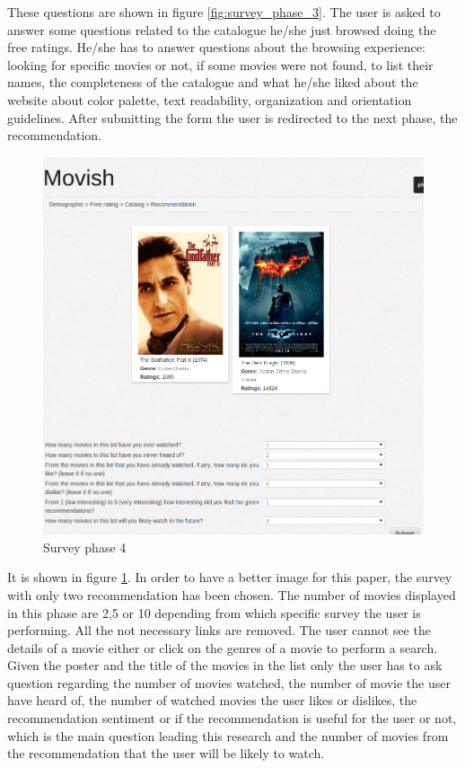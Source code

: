 These questions are shown in figure \ref{fig:survey_phase_3}. The user is asked to answer some questions related to the catalogue he/she just browsed doing the free ratings. He/she has to answer questions about the browsing experience: looking for specific movies or not, if some movies were not found, to list their names, the completeness of the catalogue and what he/she liked about the website about color palette, text readability, organization and orientation guidelines. After submitting the form the user is redirected to the next phase, the recommendation. 

\begin{figure}
  \centering
  \includegraphics[width=\textwidth]{figures/survey_recommendation.png}
  \caption{Survey phase 4}
  \label{fig:survey_phase_4}
\end{figure}

It is shown in figure \ref{fig:survey_phase_4}. In order to have a better image for this paper, the survey with only two recommendation has been chosen. The number of movies displayed in this phase are 2,5 or 10 depending from which specific survey the user is performing. All the not necessary links are removed. The user cannot see the details of a movie either or click on the genres of a movie to perform a search. Given the poster and the title of the movies in the list only the user has to ask question regarding the number of movies watched, the number of movie the user have heard of, the number of watched movies the user likes or dislikes, the recommendation sentiment or if the recommendation is useful for the user or not, which is the main question leading this research and the number of movies from the recommendation that the user will be likely to watch.  

